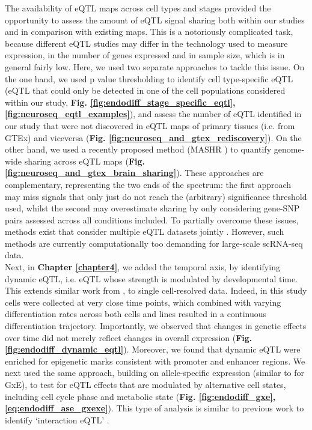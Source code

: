 The availability of eQTL maps across cell types and stages provided the opportunity to assess the amount of eQTL signal sharing both within our studies and in comparison with existing maps.
This is a notoriously complicated task, because different eQTL studies may differ in the technology used to measure expression, in the number of genes expressed and in sample size, which is in general fairly low.
Here, we used two separate approaches to tackle this issue.
On the one hand, we used p value thresholding to identify cell type-specific eQTL (eQTL that could only be detected in one of the cell populations considered within our study, \textbf{Fig. \ref{fig:endodiff_stage_specific_eqtl}, \ref{fig:neuroseq_eqtl_examples}}), and assess the number of eQTL identified in our study that were not discovered in eQTL maps of primary tissues (i.e. from GTEx) and viceversa (\textbf{Fig. \ref{fig:neuroseq_and_gtex_rediscovery}}).
On the other hand, we used a recently proposed method (MASHR \cite{urbut2019flexible}) to quantify genome-wide sharing across eQTL maps (\textbf{Fig. \ref{fig:neuroseq_and_gtex_brain_sharing}}).
These approaches are complementary, representing the two ends of the spectrum: the first approach may miss signals that only just do not reach the (arbitrary) significance threshold used, whilst the second may overestimate sharing by only considering gene-SNP pairs assessed across all conditions included.
To partially overcome these issues, methods exist that consider multiple eQTL datasets jointly \cite{flutre2013statistical, sul2013effectively}. 
However, such methods are currently computationally too demanding for large-scale scRNA-seq data. \\

Next, in \textbf{Chapter \ref{chapter4}}, we added the temporal axis, by identifying dynamic eQTL, i.e. eQTL whose strength is modulated by developmental time.
This extends similar work from \cite{francesconi2014effects, strober2019dynamic}, to single cell-resolved data.
Indeed, in this study cells were collected at very close time points, which combined with varying differentiation rates across both cells and lines resulted in a continuous differentiation trajectory.
Importantly, we observed that changes in genetic effects over time did not merely reflect changes in overall expression (\textbf{Fig. \ref{fig:endodiff_dynamic_eqtl}}).
Moreover, we found that dynamic eQTL were enriched for epigenetic marks consistent with promoter and enhancer regions.
We next used the same approach, building on allele-specific expression (similar to \cite{knowles2017allele} for GxE), to test for eQTL effects that are modulated by alternative cell states, including cell cycle phase and metabolic state (\textbf{Fig. \ref{fig:endodiff_gxe}, \ref{eq:endodiff_ase_gxexe}}).
This type of analysis is similar to previous work to identify `interaction eQTL' \cite{zhernakova2017identification, van2018single}. \\

